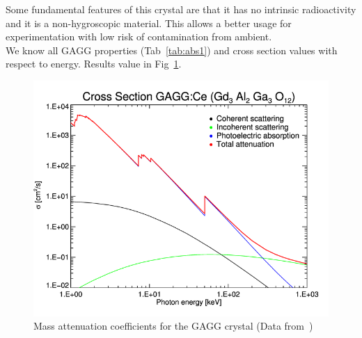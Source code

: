 \documentclass[10pt,a4paper, openany]{book}
\begin{document}
Some fundamental features of this crystal are that it has no intrinsic radioactivity and it is a non-hygroscopic material. This allows a better usage for experimentation with low risk of contamination from ambient.\\[2ex]

We know all GAGG properties (Tab~\ref{tab:abs1}) and cross section values with respect to energy. Results value in Fig~\ref{fig:cs_gagg}.

\begin{figure}[!h]
\begin{center}
\includegraphics[scale=0.25]{imm/cs_gagg.png}
\end{center}
\caption{Mass attenuation coefficients for the GAGG crystal (Data from~\cite{gagg:2})}
\label{fig:cs_gagg}
\end{figure}
\end{document}
